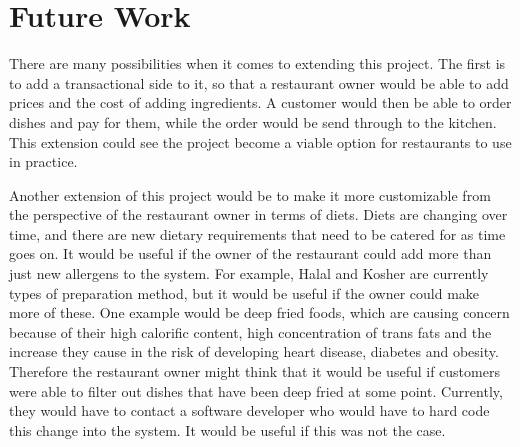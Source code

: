 \section{Future Work}

There are many possibilities when it comes to extending this project. The first is to add a transactional side to it, so that a restaurant owner would be able to add prices and the cost of adding ingredients. A customer would then be able to order dishes and pay for them, while the order would be send through to the kitchen. This extension could see the project become a viable option for restaurants to use in practice. 

Another extension of this project would be to make it more customizable from the perspective of the restaurant owner in terms of diets. Diets are changing over time, and there are new dietary requirements that need to be catered for as time goes on. It would be useful if the owner of the restaurant could add more than just new allergens to the system. For example, Halal and Kosher are currently types of preparation method, but it would be useful if the owner could make more of these. One example would be deep fried foods, which are causing concern because of their high calorific content, high concentration of trans fats and the increase they cause in the risk of developing heart disease, diabetes and obesity\cite{deep_fried_mcdonnell_2023}. Therefore the restaurant owner might think that it would be useful if customers were able to filter out dishes that have been deep fried at some point. Currently, they would have to contact a software developer who would have to hard code this change into the system. It would be useful if this was not the case.

